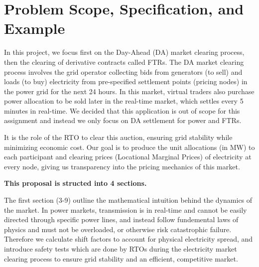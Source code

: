 \documentclass[11pt]{article}
\begin{document}
\begin{abstract}
The goal of this project is to simulate an end-to-end market clearing process for a mock electric grid, deriving electricity prices across the grid, and as an extension, clearing one auction round in the electricity derivatives market for a product called Financial Transmission Rights (FTR). We believe this application to be especially enriching to those of us exploring a career in electricity trading, as well as serving as insight into the pricing mechanics of this market in the age of surging power prices due to the rising adoption of datacenters and Artificial Intelligence.
\end{abstract}

\newpage
\tableofcontents
\newpage

\section{Problem Scope, Specification, and Example}



In this project, we focus first on the Day-Ahead (DA) market clearing process, then the clearing of derivative contracts called FTRs. The DA market clearing process involves the grid operator collecting bids from generators (to sell) and loads (to buy) electricity from pre-specified settlement points (pricing nodes) in the power grid for the next 24 hours. In this market, virtual traders also purchase power allocation to be sold later in the real-time market, which settles every 5 minutes in real-time. We decided that this application is out of scope for this assignment and instead we only focus on DA settlement for power and FTRs.

It is the role of the RTO to clear this auction, ensuring grid stability while minimizing economic cost. Our goal is to produce the unit allocations (in MW) to each participant and clearing prices (Locational Marginal Prices) of electricity at every node, giving us transparency into the pricing mechanics of this market.

\textbf{This proposal is structed into 4 sections.}

The first section (3-9) outline the mathematical intuition behind the dynamics of the market. In power markets, transmission is in real-time and cannot be easily directed through specific power lines, and instead follow fundemental laws of physics and must not be overloaded, or otherwise risk catastrophic failure. Therefore we calculate shift factors to account for physical electricity spread, and introduce safety tests which are done by RTOs during the electricity market clearing process to ensure grid stability and an efficient, competitive market. 
\end{document}
